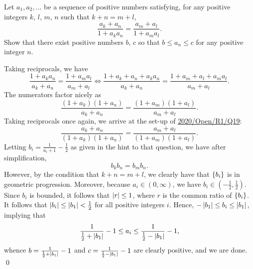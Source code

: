 \begin{question}\label{Q::2024-S-2-5}
    Let $a_1, a_2, \ldots$ be a sequence of positive numbers satisfying, for any positive integers $k$, $l$, $m$, $n$ such that $k + n = m + l$, \[\frac{a_k + a_n}{1 + a_k a_n} = \frac{a_m + a_l}{1 + a_m a_l}.\] Show that there exist positive numbers $b$, $c$ so that $b \leq a_n \leq c$ for any positive integer $n$.
\end{question}
\begin{solution*}[\credit{https://www.youtube.com/watch?v=Mrjm7aWXoNQ}{Way Tan}]
    Taking reciprocals, we have \[\frac{1 + a_k a_n}{a_k + a_n} = \frac{1 + a_m a_l}{a_m + a_l} \iff \frac{1 + a_k + a_n + a_k a_n}{a_k + a_n} = \frac{1 + a_m + a_l + a_m a_l}{a_m + a_l}.\] The numerators factor nicely as \[\frac{(1 + a_k)(1 + a_n)}{a_k + a_n} = \frac{(1 + a_m)(1 + a_l)}{a_m + a_l}.\] Taking reciprocals once again, we arrive at the set-up of \hyperref[Q::2020-O-1-19]{2020/Open/R1/Q19}: \[\frac{a_k + a_n}{(1 + a_k)(1 + a_n)} = \frac{a_m + a_l}{(1 + a_m)(1 + a_l)}.\] Letting $b_i = \frac{1}{a_i + 1} - \frac12$ as given in the hint to that question, we have after simplification, \[b_kb_n = b_m b_n.\] However, by the condition that $k + n = m + l$, we clearly have that $\left\lbrace b_i \right\rbrace$ is in geometric progression. Moreover, because $a_i \in (0, \infty)$, we have $b_i \in (-\frac12, \frac12)$. Since $b_i$ is bounded, it follows that $\left\lvert r \right\rvert \leq 1$, where $r$ is the common ratio of $\left\lbrace b_i \right\rbrace$. It follows that $\left\lvert b_i \right\rvert \leq \left\lvert b_1 \right\rvert < \frac12 $ for all positive integers $i$. Hence, $-\left\lvert b_1 \right\rvert \leq b_i \leq \left\lvert b_1 \right\rvert$, implying that \[\frac1{\frac12 + \left\lvert b_1 \right\rvert} - 1 \leq a_i \leq \frac1{\frac12-\left\lvert b_1 \right\rvert} - 1,\] whence $b = \frac1{\frac12 + \left\lvert b_1 \right\rvert} - 1$ and $c = \frac1{\frac12-\left\lvert b_1 \right\rvert} - 1$ are clearly positive, and we are done. \qed
\end{solution*}